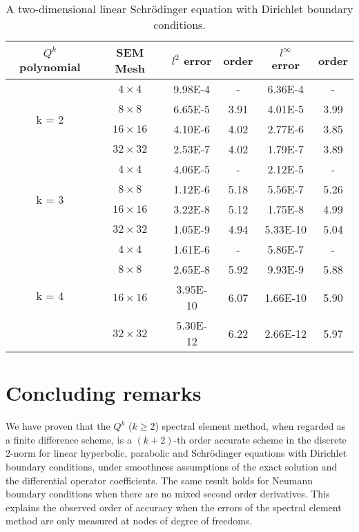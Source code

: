 \documentclass[onefignum,onetabnum]{siamart171218}
\begin{document}
\begin{table}[h]
\centering
\caption{A two-dimensional linear Schr\"{o}dinger equation with Dirichlet boundary conditions.}
\begin{tabular}{|c |c |c c|c c|}
\hline $Q^k$ polynomial  &  SEM Mesh & $l^2$ error  &  order & $l^\infty$ error & order \\
\hline
\multirow{4}{*}{k = 2} 
  &  $4\times 4$ & 9.98E-4 & - & 6.36E-4 & -\\\cline{2-6}
  &  $8\times 8$ & 6.65E-5 & 3.91 & 4.01E-5 & 3.99\\\cline{2-6}
  &  $16\times 16$ & 4.10E-6 & 4.02 & 2.77E-6 & 3.85 \\ \cline{2-6}
  &  $32\times 32$ & 2.53E-7 & 4.02 & 1.79E-7 & 3.89\\ 
\hline
\multirow{4}{*}{k = 3} 
  &  $4\times 4$ & 4.06E-5 & - & 2.12E-5 & -\\\cline{2-6}
  &  $8\times 8$ & 1.12E-6 & 5.18 & 5.56E-7 & 5.26\\\cline{2-6}
  &  $16\times 16$ & 3.22E-8 & 5.12 & 1.75E-8 & 4.99 \\ \cline{2-6}
  &  $32\times 32$ & 1.05E-9 & 4.94 & 5.33E-10 & 5.04\\ 
\hline
\multirow{4}{*}{k = 4} 
  &  $4\times 4$ & 1.61E-6 & - & 5.86E-7 & -\\\cline{2-6}
  &  $8\times 8$ & 2.65E-8 & 5.92 & 9.93E-9 & 5.88\\\cline{2-6}
  &  $16\times 16$ & 3.95E-10 & 6.07 & 1.66E-10 & 5.90 \\ \cline{2-6}
  &  $32\times 32$ & 5.30E-12 & 6.22 & 2.66E-12 & 5.97\\ 
\hline
\end{tabular}
\label{table-schrodinger}
\end{table}

\section{ Concluding remarks}
\label{concludingremark}
 
We have proven that the $Q^k$ ($k\geq 2$) spectral element method, when regarded as a finite difference scheme, is a $(k+2)$-th order accurate scheme 
in the discrete 2-norm for  linear hyperbolic, parabolic and Schr\"{o}dinger equations with Dirichlet boundary conditions, under smoothness assumptions of the exact solution 
and the differential operator coefficients.  The same result holds for Neumann boundary conditions when there are no mixed second order derivatives. 
This explains the observed order of accuracy when the errors of the spectral element method are only measured at nodes of degree of freedoms.  

\end{document}
